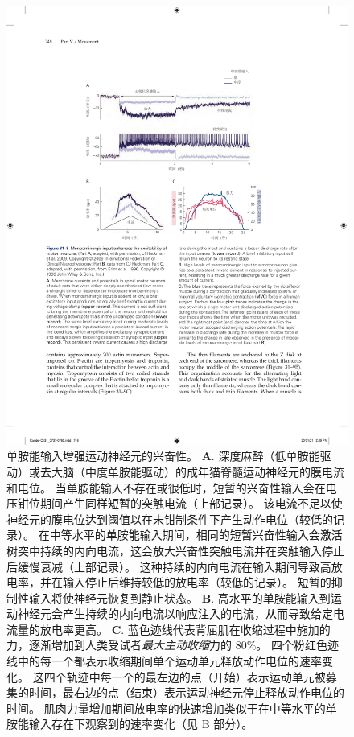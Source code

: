 \begin{figure}[htbp]
	\centering
	\includegraphics[width=0.85\linewidth]{chap31/fig_31_8}
	\caption{单胺能输入增强运动神经元的兴奋性\cite{heckman2009motoneuron,erim1996rank}。
	\textbf{A}. 深度麻醉（低单胺能驱动）或去大脑（中度单胺能驱动）的成年猫脊髓运动神经元的膜电流和电位。
	当单胺能输入不存在或很低时，短暂的兴奋性输入会在电压钳位期间产生同样短暂的突触电流（上部记录）。
	该电流不足以使神经元的膜电位达到阈值以在未钳制条件下产生动作电位（较低的记录）。
	在中等水平的单胺能输入期间，相同的短暂兴奋性输入会激活树突中持续的内向电流，这会放大兴奋性突触电流并在突触输入停止后缓慢衰减（上部记录）。
	这种持续的内向电流在输入期间导致高放电率，并在输入停止后维持较低的放电率（较低的记录）。
	短暂的抑制性输入将使神经元恢复到静止状态。
	\textbf{B}. 高水平的单胺能输入到运动神经元会产生持续的内向电流以响应注入的电流，从而导致给定电流量的放电率更高。
	\textbf{C}. 蓝色迹线代表背屈肌在收缩过程中施加的力，逐渐增加到人类受试者\textit{最大主动收缩}力的 80\%。
	四个粉红色迹线中的每一个都表示收缩期间单个运动单元释放动作电位的速率变化。 
	这四个轨迹中每一个的最左边的点（开始）表示运动单元被募集的时间，最右边的点（结束）表示运动神经元停止释放动作电位的时间。
	肌肉力量增加期间放电率的快速增加类似于在中等水平的单胺能输入存在下观察到的速率变化（见 B 部分）。}
	\label{fig:31_8}
\end{figure}


